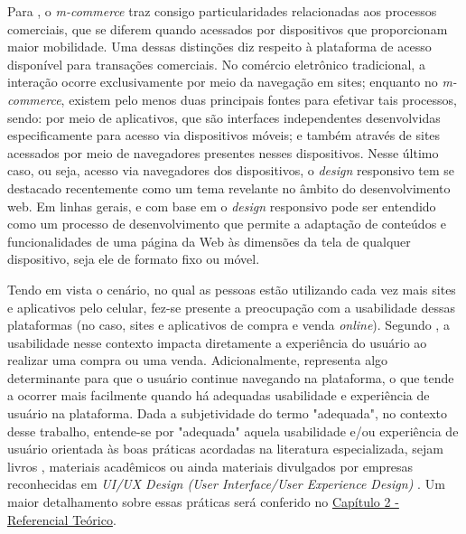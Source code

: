 Para , o \textit{m-commerce} traz consigo particularidades relacionadas aos processos comerciais, que se diferem quando acessados por dispositivos que proporcionam maior mobilidade. Uma dessas distinções diz respeito à plataforma de acesso disponível para transações comerciais. No comércio eletrônico tradicional, a interação ocorre exclusivamente por meio da navegação em sites; enquanto no \textit{m-commerce}, existem pelo menos duas principais fontes para efetivar tais processos, sendo: por meio de aplicativos, que são interfaces independentes desenvolvidas especificamente para acesso via dispositivos móveis; e também através de sites acessados por meio de navegadores presentes nesses dispositivos. Nesse último caso, ou seja, acesso via navegadores dos dispositivos, o \textit{design} responsivo tem se destacado recentemente como um tema revelante no âmbito do desenvolvimento web. Em linhas gerais, e com base em  o \textit{design} responsivo pode ser entendido como um processo de desenvolvimento que permite a adaptação de conteúdos e funcionalidades de uma página da Web às dimensões da tela de qualquer dispositivo, seja ele de formato fixo ou móvel.

Tendo em vista o cenário, no qual as pessoas estão utilizando cada vez mais sites e aplicativos pelo celular, fez-se presente a preocupação com a usabilidade dessas plataformas (no caso, sites e aplicativos de compra e venda \textit{online}). Segundo , a usabilidade nesse contexto impacta diretamente a experiência do usuário ao realizar uma compra ou uma venda. Adicionalmente, representa algo determinante para que o usuário continue navegando na plataforma, o que tende a ocorrer mais facilmente quando há adequadas usabilidade e experiência de usuário na plataforma. Dada a subjetividade do termo "adequada", no contexto desse trabalho, entende-se por "adequada" aquela usabilidade e/ou experiência de usuário orientada às boas práticas acordadas na literatura especializada, sejam livros \cite{AtomicDesignFrost}, materiais acadêmicos \cite{HeuristicasNielsen} ou ainda materiais divulgados por empresas reconhecidas em \textit{UI/UX Design (User Interface/User Experience Design)} \cite{MaterialDesign3}. Um maior detalhamento sobre essas práticas será conferido no \hyperref[chap:ReferencialTeorico]{Capítulo 2 - Referencial Teórico}.

